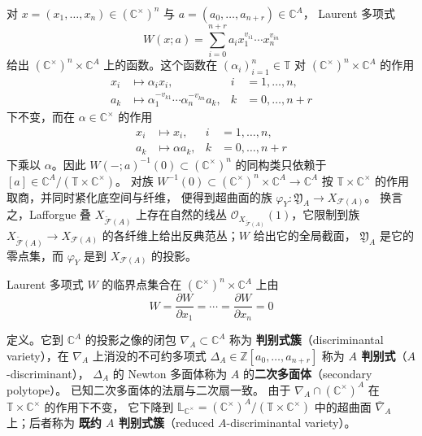 对 $x=(x_{1},\dots,x_{n})\in(\mathbb{C}^{\times})^{n}$ 与 $a=(a_{0},\dots,a_{n+r})\in\mathbb{C}^{A}$，
Laurent 多项式
\begin{equation}
  W(x;a)=\sum_{i=0}^{n+r}a_{i}x_{1}^{v_{i1}}\cdots x_{n}^{v_{in}} \tag{5.6}
\end{equation}
给出 $(\mathbb{C}^{\times})^{n}\times\mathbb{C}^{A}$ 上的函数。这个函数在 $(\alpha_{i})_{i=1}^{n}\in\mathbb{T}$
对 $(\mathbb{C}^{\times})^{n}\times\mathbb{C}^{A}$ 的作用
\begin{align}
  x_{i}&\mapsto\alpha_{i}x_{i}, & i&=1,\dots,n, \tag{5.7}\\
  a_{k}&\mapsto\alpha_{1}^{-v_{k1}}\cdots\alpha_{n}^{-v_{kn}}a_{k}, & k&=0,\dots,n+r \tag{5.8}
\end{align}
下不变，而在 $\alpha\in\mathbb{C}^{\times}$ 的作用
\begin{align}
  x_{i}&\mapsto x_{i}, & i&=1,\dots,n, \tag{5.9}\\
  a_{k}&\mapsto\alpha a_{k}, & k&=0,\dots,n+r \tag{5.10}
\end{align}
下乘以 $\alpha$。因此 $W(-;a)^{-1}(0)\subset(\mathbb{C}^{\times})^{n}$ 的同构类只依赖于
$[a]\in\mathbb{C}^{A}/(\mathbb{T}\times\mathbb{C}^{\times})$。
对族 $W^{-1}(0)\subset(\mathbb{C}^{\times})^{n}\times\mathbb{C}^{A}\to\mathbb{C}^{A}$
按 $\mathbb{T}\times\mathbb{C}^{\times}$ 的作用取商，并同时紧化底空间与纤维，
便得到超曲面的族 $\varphi_{Y}\colon\mathfrak{Y}_{A}\to X_{\mathcal{F}(A)}$。
换言之，Lafforgue 叠 $X_{\tilde{\mathcal{F}}(A)}$ 上存在自然的线丛
$\mathcal{O}_{X_{\tilde{\mathcal{F}}(A)}}(1)$，它限制到族
$X_{\tilde{\mathcal{F}}(A)}\to X_{\mathcal{F}(A)}$ 的各纤维上给出反典范丛；$W$ 给出它的全局截面，
$\mathfrak{Y}_{A}$ 是它的零点集，而 $\varphi_{Y}$ 是到 $X_{\mathcal{F}(A)}$ 的投影。

Laurent 多项式 $W$ 的临界点集合在 $(\mathbb{C}^{\times})^{n}\times\mathbb{C}^{A}$ 上由
\begin{equation}
  W=\frac{\partial W}{\partial x_{1}}=\cdots=\frac{\partial W}{\partial x_{n}}=0 \tag{5.11}
\end{equation}


定义。它到 $\mathbb{C}^{A}$ 的投影之像的闭包 $\nabla_{A}\subset\mathbb{C}^{A}$ 称为
\textbf{判别式簇}（discriminantal variety），在 $\nabla_{A}$ 上消没的不可约多项式
$\Delta_{A}\in\mathbb{Z}[a_{0},\dots,a_{n+r}]$ 称为 \textbf{$A$ 判别式}（$A$-discriminant），
$\Delta_{A}$ 的 Newton 多面体称为 $A$ 的\textbf{二次多面体}（secondary polytope）。
已知二次多面体的法扇与二次扇一致。
由于 $\nabla_{A}\cap(\mathbb{C}^{\times})^{A}$ 在 $\mathbb{T}\times\mathbb{C}^{\times}$ 的作用下不变，
它下降到 $\mathbb{L}_{\mathbb{C}^{\times}}=(\mathbb{C}^{\times})^{A}/(\mathbb{T}\times\mathbb{C}^{\times})$
中的超曲面 $\overline{\nabla}_{A}$ 上；后者称为
\textbf{既约 $A$ 判别式簇}（reduced $A$-discriminantal variety）。

